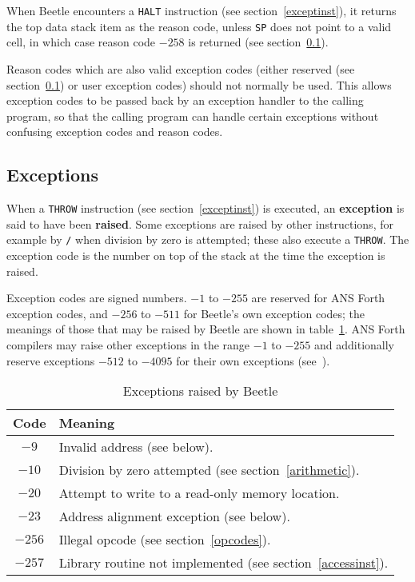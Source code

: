 \documentclass[english]{article}
\newlength{\opcode}\opcode=0.5in
\begin{document}
When Beetle encounters a {\tt HALT} instruction (see section~\ref{exceptinst}),
it returns the top data stack item as the reason code, unless {\tt SP} does not
point to a valid cell, in which case reason code $-258$ is returned (see section~\ref{exceptions}).

Reason codes which are also valid exception codes (either reserved (see section~\ref{exceptions})
or user exception codes) should not normally be used. This
allows exception codes to be passed back by an exception handler to the calling
program, so that the calling program can handle certain exceptions without
confusing exception codes and reason codes.


\subsection{Exceptions}
\label{exceptions}

When a {\tt THROW} instruction (see section~\ref{exceptinst}) is executed, an
{\bf exception} is said to have been {\bf raised}. Some exceptions are raised by
other instructions, for example by {\tt /} when division by zero is attempted;
these also execute a {\tt THROW}. The exception code is the number on top of the
stack at the time the exception is raised.

Exception codes are signed numbers. $-1$ to $-255$ are reserved for ANS Forth
exception codes, and $-256$ to $-511$ for Beetle's own exception codes; the meanings
of those that may be raised by Beetle are shown in table~\ref{excepttable}. ANS
Forth compilers may raise other exceptions in the range $-1$ to $-255$ and
additionally reserve exceptions $-512$ to $-4095$ for their own exceptions
(see~\cite[section 9.3.1]{ANSIforth}).

\begin{table}[htbp]
\begin{center}
\begin{tabular}{cl} \toprule
\bf Code & \bf Meaning \\ \midrule
$-9$ & Invalid address (see below). \\
$-10$ & Division by zero attempted (see section~\ref{arithmetic}). \\
$-20$ & Attempt to write to a read-only memory location. \\
$-23$ & Address alignment exception (see below). \\
$-256$ & Illegal opcode (see section~\ref{opcodes}). \\
$-257$ & Library routine not implemented (see section~\ref{accessinst}). \\ \bottomrule
\end{tabular}
\caption{\label{excepttable}Exceptions raised by Beetle}
\end{center}
\end{table}
\end{document}
